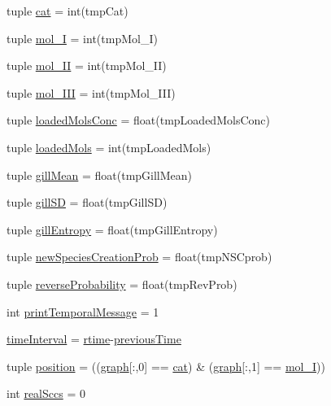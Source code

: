 \begin{DoxyCompactItemize}
\item 
tuple \hyperlink{a00096_aea872e34fe0da6302f6195f1b2315148}{cat} = int(tmp\-Cat)
\item 
tuple \hyperlink{a00096_ae13d6607ffa236891a9af05bfa88cfcc}{mol\-\_\-\-I} = int(tmp\-Mol\-\_\-\-I)
\item 
tuple \hyperlink{a00096_a8f2878f5909e4aeb9155a1103eaba413}{mol\-\_\-\-I\-I} = int(tmp\-Mol\-\_\-\-I\-I)
\item 
tuple \hyperlink{a00096_a20047e8516f386a7e98ffa0efec09471}{mol\-\_\-\-I\-I\-I} = int(tmp\-Mol\-\_\-\-I\-I\-I)
\item 
tuple \hyperlink{a00096_abe83f5e0ae3bd65da15a697a979aeea1}{loaded\-Mols\-Conc} = float(tmp\-Loaded\-Mols\-Conc)
\item 
tuple \hyperlink{a00096_ab4566d46d368eb4f93ff6db5191648bd}{loaded\-Mols} = int(tmp\-Loaded\-Mols)
\item 
tuple \hyperlink{a00096_a4e862896701636d17752f14810ff687f}{gill\-Mean} = float(tmp\-Gill\-Mean)
\item 
tuple \hyperlink{a00096_acdb3e72aea08c29494799fd08763b406}{gill\-S\-D} = float(tmp\-Gill\-S\-D)
\item 
tuple \hyperlink{a00096_a4c214eb4f6812d6182bae32715bce3ad}{gill\-Entropy} = float(tmp\-Gill\-Entropy)
\item 
tuple \hyperlink{a00096_a47b24df6e487f6dd90158dde93cc7c93}{new\-Species\-Creation\-Prob} = float(tmp\-N\-S\-Cprob)
\item 
tuple \hyperlink{a00096_aa7db2dba66810044f9c5238eccc995b7}{reverse\-Probability} = float(tmp\-Rev\-Prob)
\item 
int \hyperlink{a00096_a3de1ee32e24403b152d565d8c52cf7fd}{print\-Temporal\-Message} = 1
\item 
\hyperlink{a00096_a7d0f86310c439e970e0b41121364027c}{time\-Interval} = \hyperlink{a00096_a162a08b0497058c76e7e885c03a01336}{rtime}-\/\hyperlink{a00096_aff96a31e98ac46cb47a67b74f5d87351}{previous\-Time}
\item 
tuple \hyperlink{a00096_ac09e85f8df5b7c8c7d2caf87e9193421}{position} = ((\hyperlink{a00096_ab45392da38059bf7557c22cbc73e5580}{graph}\mbox{[}\-:,0\mbox{]} == \hyperlink{a00096_aea872e34fe0da6302f6195f1b2315148}{cat}) \& (\hyperlink{a00096_ab45392da38059bf7557c22cbc73e5580}{graph}\mbox{[}\-:,1\mbox{]} == \hyperlink{a00096_ae13d6607ffa236891a9af05bfa88cfcc}{mol\-\_\-\-I}))
\item 
int \hyperlink{a00096_ac6aaa0ac5d13b0736ab3179dc1ed388d}{real\-Sccs} = 0
\item 

\end{DoxyCompactItemize}
